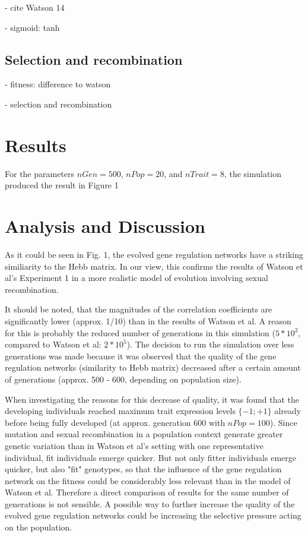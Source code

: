 \documentclass{article}
\begin{document}
- cite Watson 14 

- sigmoid: tanh

\subsection{Selection and recombination}
- fitness: difference to watson

- selection and recombination



\section{Results}

For the parameters $nGen = 500$, $nPop = 20$, and $nTrait = 8$, the simulation produced the result in Figure 1




\section{Analysis and Discussion}

As it could be seen in Fig. 1, the evolved gene regulation networks have a striking similiarity to the Hebb matrix. In our view, this confirms the results of Watson et al's Experiment 1 in a more realistic model of evolution involving sexual recombination.

It should be noted, that the magnitudes of the correlation coefficients are significantly lower (approx. 1/10) than in the results of Watson et al.
A reason for this is probably the reduced number of generations in this simulation ($5*10^2$, compared to Watson et al: $2*10^5$).
The decision to run the simulation over less generations was made because it was observed that the quality of the gene regulation networks (similarity to Hebb matrix) decreased after a certain amount of generations (approx. 500 - 600, depending on population size).

When investigating the reasons for this decrease of quality, it was found that the developing individuals reached maximum trait expression levels $\{-1; +1\}$ already before being fully developed (at approx. generation 600 with $nPop = 100$).
Since mutation and sexual recombination in a population context generate greater genetic variation than in Watson et al's setting with one representative individual, fit individuals emerge quicker.
But not only fitter individuals emerge quicker, but also "fit" genotypes, so that the influence of the gene regulation network on the fitness could be considerably less relevant than in the model of Watson et al.
Therefore a direct comparison of results for the same number of generations is not sensible.
A possible way to further increase the quality of the evolved gene regulation networks could be increasing the selective pressure acting on the population.
\newline
\end{document}
